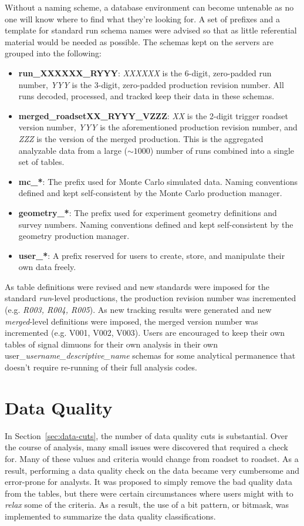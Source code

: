 Without a naming scheme, a database environment can become untenable as no one will know where to find what they're looking for. A set of prefixes and a template for standard run schema names were advised so that as little referential material would be needed as possible. The schemas kept on the servers are grouped into the following:
\begin{itemize}
	\item \textbf{run\_XXXXXX\_RYYY}: \emph{XXXXXX} is the 6-digit, zero-padded run number, \emph{YYY} is the 3-digit, zero-padded production revision number. All runs decoded, processed, and tracked keep their data in these schemas.
	\item \textbf{merged\_roadsetXX\_RYYY\_VZZZ}: \emph{XX} is the 2-digit trigger roadset version number, \emph{YYY} is the aforementioned production revision number, and \emph{ZZZ} is the version of the merged production. This is the aggregated analyzable data from a large ($\sim1000$) number of runs combined into a single set of tables.
	\item \textbf{mc\_*}: The prefix used for Monte Carlo simulated data. Naming conventions defined and kept self-consistent by the Monte Carlo production manager.
	\item \textbf{geometry\_*}: The prefix used for experiment geometry definitions and survey numbers. Naming conventions defined and kept self-consistent by the geometry production manager.
	\item \textbf{user\_*}: A prefix reserved for users to create, store, and manipulate their own data freely.
\end{itemize}

As table definitions were revised and new standards were imposed for the standard \emph{run}-level productions, the production revision number was incremented (e.g. \emph{R003, R004, R005}). As new tracking results were generated and new \emph{merged}-level definitions were imposed, the merged version number was incremented (e.g. V001, V002, V003). Users are encouraged to keep their own tables of signal dimuons for their own analysis in their own user\_\emph{username\_descriptive\_name} schemas for some analytical permanence that doesn't require re-running of their full analysis codes.

\section{Data Quality}\label{sec:dq}

In Section~\ref{sec:data-cuts}, the number of data quality cuts is substantial. Over the course of analysis, many small issues were discovered that required a check for. Many of these values and criteria would change from roadset to roadset. As a result, performing a data quality check on the data became very cumbersome and error-prone for analysts. It was proposed to simply remove the bad quality data from the tables, but there were certain circumstances where users might with to \emph{relax} some of the criteria. As a result, the use of a bit pattern, or bitmask, was implemented to summarize the data quality classifications. 

